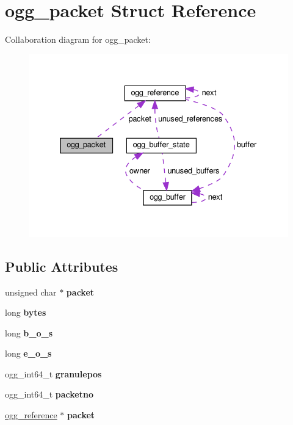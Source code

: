 \hypertarget{structogg__packet}{}\section{ogg\+\_\+packet Struct Reference}
\label{structogg__packet}


Collaboration diagram for ogg\+\_\+packet\+:
\nopagebreak
\begin{figure}[H]
\begin{center}
\leavevmode
\includegraphics[width=332pt]{structogg__packet__coll__graph}
\end{center}
\end{figure}
\subsection*{Public Attributes}
\begin{DoxyCompactItemize}
\item 
\mbox{\label{structogg__packet_a6b48f432c79884fa25af799318d1f39c}} 
unsigned char $\ast$ {\bfseries packet}
\item 
\mbox{\label{structogg__packet_a4438269ce6025d8817865ae66d5881f1}} 
long {\bfseries bytes}
\item 
\mbox{\label{structogg__packet_adbf12677237d6f5333017de9b59b4ea7}} 
long {\bfseries b\+\_\+o\+\_\+s}
\item 
\mbox{\label{structogg__packet_aa367e7c5425c5f65cbd126b82dfc72e8}} 
long {\bfseries e\+\_\+o\+\_\+s}
\item 
\mbox{\label{structogg__packet_a838d9a000e08bae982409bc2734fc566}} 
ogg\+\_\+int64\+\_\+t {\bfseries granulepos}
\item 
\mbox{\label{structogg__packet_a60e257b3a8f843135474457197c65a45}} 
ogg\+\_\+int64\+\_\+t {\bfseries packetno}
\item 
\mbox{\label{structogg__packet_ae1a4dd30b3905cf8a2836f4c0ad4245a}} 
\hyperlink{structogg__reference}{ogg\+\_\+reference} $\ast$ {\bfseries packet}
\end{DoxyCompactItemize}


